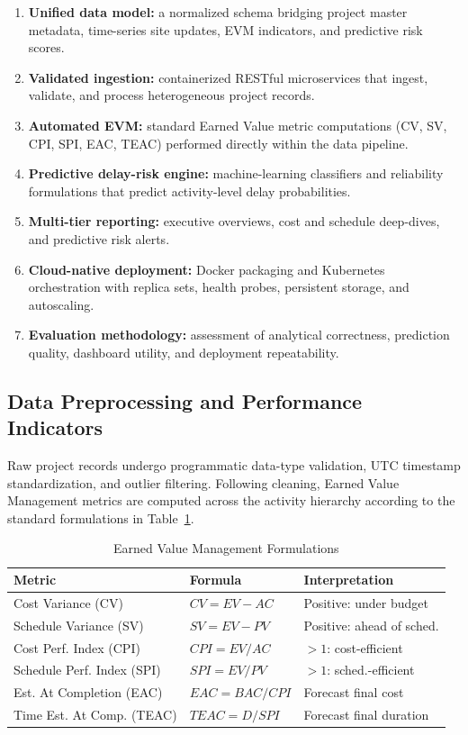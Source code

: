 \documentclass[conference]{IEEEtran}
\begin{document}
\begin{enumerate}
  \item \textbf{Unified data model:} a normalized schema bridging project master metadata, time-series site updates, EVM indicators, and predictive risk scores.
  \item \textbf{Validated ingestion:} containerized RESTful microservices that ingest, validate, and process heterogeneous project records.
  \item \textbf{Automated EVM:} standard Earned Value metric computations (CV, SV, CPI, SPI, EAC, TEAC) performed directly within the data pipeline.
  \item \textbf{Predictive delay-risk engine:} machine-learning classifiers and reliability formulations that predict activity-level delay probabilities.
  \item \textbf{Multi-tier reporting:} executive overviews, cost and schedule deep-dives, and predictive risk alerts.
  \item \textbf{Cloud-native deployment:} Docker packaging and Kubernetes orchestration with replica sets, health probes, persistent storage, and autoscaling.
  \item \textbf{Evaluation methodology:} assessment of analytical correctness, prediction quality, dashboard utility, and deployment repeatability.
\end{enumerate}

\subsection{Data Preprocessing and Performance Indicators}

Raw project records undergo programmatic data-type validation, UTC timestamp standardization, and outlier filtering. Following cleaning, Earned Value Management metrics are computed across the activity hierarchy according to the standard formulations in Table~\ref{tab:evm}.

\begin{table}[t]
\caption{Earned Value Management Formulations}
\label{tab:evm}
\centering
\footnotesize
\begin{tabular}{@{}p{2.9cm}p{2.0cm}p{2.1cm}@{}}
\toprule
\textbf{Metric} & \textbf{Formula} & \textbf{Interpretation} \\
\midrule
Cost Variance (CV) & \(CV = EV - AC\) & Positive: under budget \\
Schedule Variance (SV) & \(SV = EV - PV\) & Positive: ahead of sched. \\
Cost Perf. Index (CPI) & \(CPI = EV / AC\) & \(>1\): cost-efficient \\
Schedule Perf. Index (SPI) & \(SPI = EV / PV\) & \(>1\): sched.-efficient \\
Est. At Completion (EAC) & \(EAC = BAC / CPI\) & Forecast final cost \\
Time Est. At Comp. (TEAC) & \(TEAC = D / SPI\) & Forecast final duration \\
\bottomrule
\end{tabular}
\end{table}
\end{document}
